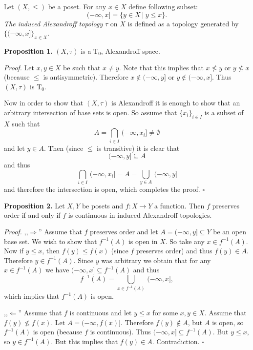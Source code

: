 \documentclass[12pt]{article}
\begin{document}
Let $(X,\leq)$ be a poset. For any $x\in X$ define following subset:
$$(-\infty,x]=\{y\in X\ |\ y\leq x\}.$$
\textit{The induced Alexandroff topology} $\tau$ on $X$ is defined as a topology generated by $\{(-\infty,x]\}_{x\in X}$.

\textbf{Proposition 1.} $(X,\tau)$ is a $\mathrm{T}_{0}$, Alexandroff space.

\textit{Proof.} Let $x,y\in X$ be such that $x\neq y$. Note that this implies that $x\not\leq y$ or $y\not\leq x$ (because $\leq$ is antisymmetric). Therefore $x\not\in (-\infty,y]$ or $y\not\in (-\infty,x]$. Thus $(X,\tau)$ is $\mathrm{T}_{0}$.

Now in order to show that $(X,\tau)$ is Alexandroff it is enough to show that an arbitrary intersection of base sets is open. So assume that $\{x_i\}_{i\in I}$ is a subset of $X$ such that 
$$A=\bigcap_{i\in I}\,(-\infty,x_i]\neq\emptyset$$
and let $y\in A$. Then (since $\leq$ is transitive) it is clear that 
$$(-\infty,y]\subseteq A$$
and thus
$$\bigcap_{i\in I}\,(-\infty,x_i]=A=\bigcup_{y\in A}\,(-\infty,y]$$
and therefore the intersection is open, which completes the proof. $\square$

\textbf{Proposition 2.} Let $X,Y$ be posets and $f:X\to Y$ a function. Then $f$ preserves order if and only if $f$ is continuous in induced Alexandroff topologies.

\textit{Proof.} ,,$\Rightarrow$'' Assume that $f$ preserves order and let $A=(-\infty,y]\subseteq Y$ be an open base set. We wish to show that $f^{-1}(A)$ is open in $X$. So take any $x\in f^{-1}(A)$. Now if $y\leq x$, then $f(y)\leq f(x)$ (since $f$ preserves order) and thus $f(y)\in A$. Therefore $y\in f^{-1}(A)$. Since $y$ was arbitrary we obtain that for any $x\in f^{-1}(A)$ we have $(-\infty, x]\subseteq f^{-1}(A)$ and thus 
$$f^{-1}(A)=\bigcup_{x\in f^{-1}(A)}\, (-\infty, x],$$
which implies that $f^{-1}(A)$ is open.

,,$\Leftarrow$'' Assume that $f$ is continuous and let $y\leq x$ for some $x,y\in X$. Assume that $f(y)\not\leq f(x)$. Let $A=(-\infty,f(x)]$. Therefore $f(y)\not\in A$, but $A$ is open, so $f^{-1}(A)$ is open (because $f$ is continuous). Thus $(-\infty,x]\subseteq f^{-1}(A)$. But $y\leq x$, so $y\in f^{-1}(A)$. But this implies that $f(y)\in A$. Contradiction. $\square$
\end{document}
